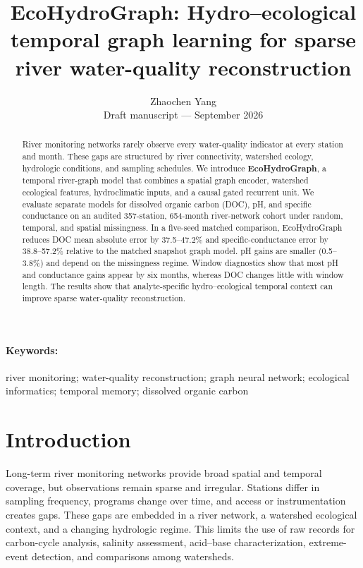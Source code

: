 \documentclass[11pt]{article}
\title{\textbf{EcoHydroGraph: Hydro--ecological temporal graph learning for sparse river water-quality reconstruction}}
\author{Zhaochen Yang\\[2pt]\small Draft manuscript --- September 2026}
\date{}
\begin{document}
\maketitle

\begin{abstract}
River monitoring networks rarely observe every water-quality indicator at every station and month. These gaps are structured by river connectivity, watershed ecology, hydrologic conditions, and sampling schedules. We introduce \textbf{EcoHydroGraph}, a temporal river-graph model that combines a spatial graph encoder, watershed ecological features, hydroclimatic inputs, and a causal gated recurrent unit. We evaluate separate models for dissolved organic carbon (DOC), pH, and specific conductance on an audited 357-station, 654-month river-network cohort under random, temporal, and spatial missingness. In a five-seed matched comparison, EcoHydroGraph reduces DOC mean absolute error by 37.5--47.2\% and specific-conductance error by 38.8--57.2\% relative to the matched snapshot graph model. pH gains are smaller (0.5--3.8\%) and depend on the missingness regime. Window diagnostics show that most pH and conductance gains appear by six months, whereas DOC changes little with window length. The results show that analyte-specific hydro--ecological temporal context can improve sparse water-quality reconstruction.
\end{abstract}
\paragraph{Keywords:} river monitoring; water-quality reconstruction; graph neural network; ecological informatics; temporal memory; dissolved organic carbon

\section{Introduction}
Long-term river monitoring networks provide broad spatial and temporal coverage, but observations remain sparse and irregular. Stations differ in sampling frequency, programs change over time, and access or instrumentation creates gaps. These gaps are embedded in a river network, a watershed ecological context, and a changing hydrologic regime. This limits the use of raw records for carbon-cycle analysis, salinity assessment, acid--base characterization, extreme-event detection, and comparisons among watersheds.
\end{document}
